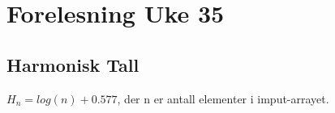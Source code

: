 \documentclass[11pt]{article}
\begin{document}
\section{Forelesning Uke 35}

	\subsection{Harmonisk Tall}
			
	$H_n = log(n) + 0.577$, der n er antall elementer i imput-arrayet.
\end{document}
